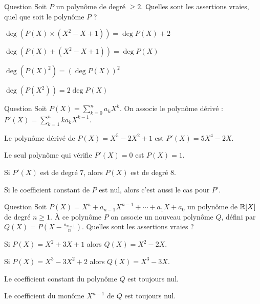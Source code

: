 \begin{multi}[multiple,feedback=
{On a la formule \(\deg(P\times Q) = \deg P + \deg Q\) mais, il n'y a pas de formule pour la somme, car \(\deg(P + Q)\) peut être strictement plus petit que \(\deg P\) et \(\deg Q\).
}]{Question}
Soit \(P\) un polynôme de degré \(\ge 2\).
Quelles sont les assertions vraies, quel que soit le polynôme \(P\) ?

    \item* \(\deg( P(X) \times (X^2-X+1) ) = \deg P(X) + 2\)
    \item \(\deg( P(X) + (X^2-X+1) ) = \deg P(X)\)
    \item \(\deg( P(X)^2 ) = (\deg P(X))^2\)
    \item* \(\deg( P(X^2) ) = 2\deg P(X)\)
\end{multi}


\begin{multi}[multiple,feedback=
{Le polynôme dérivé s'obtient comme si on dérivait la fonction \(X \mapsto P(X)\). 
}]{Question}
Soit \(P(X) = \sum_{k=0}^n a_k X^k\). On associe le polynôme dérivé :
\(P'(X) = \sum_{k=1}^n ka_k X^{k-1}\).

    \item Le polynôme dérivé de \(P(X) = X^5-2X^2+1\) est \(P'(X)=5X^4-2X\).
    \item Le seul polynôme qui vérifie \(P'(X)=0\) est \(P(X)=1\).
    \item* Si \(P'(X)\) est de degré \(7\), alors \(P(X)\) est de degré \(8\).
    \item Si le coefficient constant de \(P\) est nul, alors c'est aussi le cas pour \(P'\).
\end{multi}


\begin{multi}[multiple,feedback=
{Cette transformation est faite afin que le coefficient du monôme \(X^{n-1}\) de \(Q\) soit toujours nul.
}]{Question}
Soit \(P(X) = X^n + a_{n-1}X^{n-1} + \cdots + a_1X+a_0\) un polynôme de \(\mathbb{R}[X]\) de degré \(n \ge 1\). À ce polynôme \(P\) on associe un nouveau polynôme \(Q\), défini par \(Q(X) = P(X - \frac{a_{n-1}}{n})\).
Quelles sont les assertions vraies ?

    \item Si \(P(X) = X^2+3X+1\) alors \(Q(X) = X^2-2X\).
    \item* Si \(P(X) = X^3-3X^2+2\) alors \(Q(X) = X^3-3X\).
    \item Le coefficient constant du polynôme \(Q\) est toujours nul.
    \item* Le coefficient du monôme \(X^{n-1}\) de \(Q\) est toujours nul.
\end{multi}


